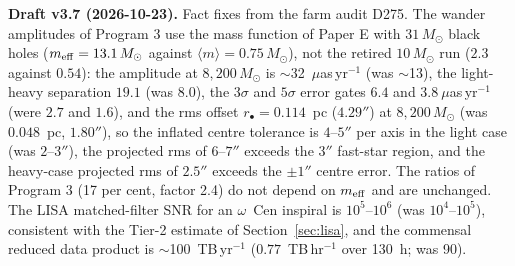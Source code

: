 \documentclass[11pt]{article}
\newcommand{\msun}{\ensuremath{M_\odot}}
\newcommand{\ocen}{\ensuremath{\omega}~Cen}
\begin{document}
\textbf{Draft v3.7 (2026-10-23).} Fact fixes from the farm audit D275. The wander amplitudes of Program 3 use the mass function of Paper E with $31\,\msun$ black holes ($m_{\rm eff} = 13.1\,\msun$ against $\langle m\rangle = 0.75\,\msun$), not the retired $10\,\msun$ run ($2.3$ against $0.54$): the amplitude at $8{,}200\,\msun$ is $\sim$32~$\mu$as\,yr$^{-1}$ (was $\sim$13), the light-heavy separation $19.1$ (was $8.0$), the $3\sigma$ and $5\sigma$ error gates $6.4$ and $3.8~\mu$as\,yr$^{-1}$ (were $2.7$ and $1.6$), and the rms offset $r_{\bullet} = 0.114$~pc ($4.29''$) at $8{,}200\,\msun$ (was $0.048$~pc, $1.80''$), so the inflated centre tolerance is $4$--$5''$ per axis in the light case (was $2$--$3''$), the projected rms of $6$--$7''$ exceeds the $3''$ fast-star region, and the heavy-case projected rms of $2.5''$ exceeds the $\pm1''$ centre error. The ratios of Program 3 (17 per cent, factor 2.4) do not depend on $m_{\rm eff}$ and are unchanged. The LISA matched-filter SNR for an \ocen{} inspiral is $10^{5}$--$10^{6}$ (was $10^{4}$--$10^{5}$), consistent with the Tier-2 estimate of Section~\ref{sec:lisa}, and the commensal reduced data product is $\sim$100~TB\,yr$^{-1}$ ($0.77$~TB\,hr$^{-1}$ over 130~h; was 90).
\end{document}
